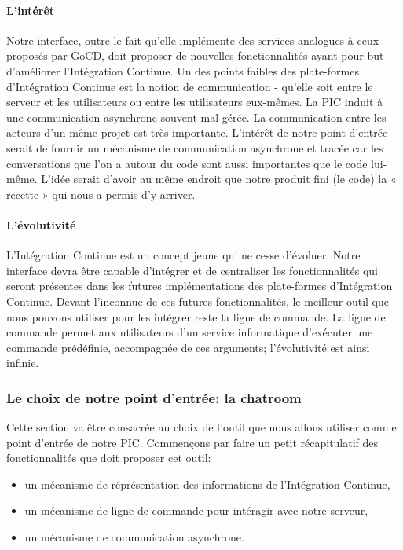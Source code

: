           \paragraph{L'intérêt} Notre interface, outre le fait qu'elle implémente des services analogues à ceux proposés par GoCD, doit proposer de nouvelles fonctionnalités ayant pour but d'améliorer l'Intégration Continue.
          Un des points faibles des plate-formes d'Intégration Continue est la notion de communication - qu'elle soit entre le serveur et les utilisateurs ou entre les utilisateurs eux-mêmes. La PIC induit à une communication asynchrone souvent mal gérée. La communication entre les acteurs d'un même projet est très importante. L'intérêt de notre point d'entrée serait de fournir un mécanisme de communication asynchrone et tracée car les conversations que l'on a autour du code sont aussi importantes que le code lui-même. L'idée serait d'avoir au même endroit que notre produit fini (le code) la « recette » qui nous a permis d'y arriver.

          \paragraph{L'évolutivité} L'Intégration Continue est un concept jeune qui ne cesse d'évoluer. Notre interface devra être capable d'intégrer et de centraliser les fonctionnalités qui seront présentes dans les futures implémentations des plate-formes d'Intégration Continue.
          Devant l'inconnue de ces futures fonctionnalités, le meilleur outil que nous pouvons utiliser pour les intégrer reste la ligne de commande. La ligne de commande permet aux utilisateurs d'un service informatique d'exécuter une commande prédéfinie, accompagnée de ces arguments; l'évolutivité est ainsi infinie.

        \subsubsection{Le choix de notre point d'entrée: la chatroom}
        Cette section va être consacrée au choix de l'outil que nous allons utiliser comme point d'entrée de notre PIC. Commençons par faire un petit récapitulatif des fonctionnalités que doit proposer cet outil:\\

        \begin{itemize}
          \item un mécanisme de réprésentation des informations de l'Intégration Continue,
          \item un mécanisme de ligne de commande pour intéragir avec notre serveur,
          \item un mécanisme de communication asynchrone.\\
        \end{itemize}

